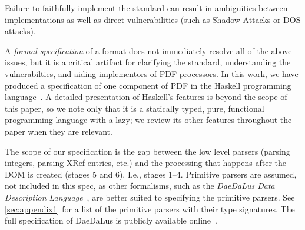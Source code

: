 Failure to faithfully implement the standard can result in ambiguities
between implementations as well as direct vulnerabilities (such as
Shadow Attacks or DOS attacks).


A \emph{formal specification} of a format does not immediately resolve
all of the above issues, but it is a critical artifact for clarifying
the standard, understanding the vulnerabilties, and aiding
implementors of PDF processors.
%
In this work, we have produced a specification of one component of PDF
in the Haskell programming language~\cite{jones2003haskell}.
%
A detailed presentation of Haskell's features is beyond the scope of
this paper, so we note only that it is a statically typed, pure,
functional programming language with a lazy;
%
we review its other features throughout the paper when they are
relevant.

The scope of our specification is the gap between the low level
parsers (parsing integers, parsing XRef entries, etc.) and the
processing that happens after the DOM is created (stages 5 and 6).
%
I.e., stages 1--4.
%
Primitive parsers are assumed, not included in this spec, as other
formalisms, such as the \emph{DaeDaLus Data Description
  Language}~\cite{daedalusrepo}, are better suited to specifying the
primitive parsers.
%
See \cref{sec:appendix1} for a list of the primitive parsers
with their type signatures.
%
The full specification of DaeDaLus is publicly available
online~\cite{daedalusrepo}.

